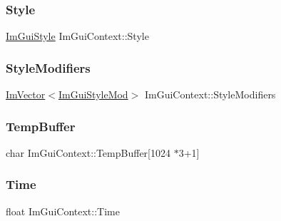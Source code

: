 \hypertarget{struct_im_gui_context_a2e682502e1a3d2c399171dd3c4fc969d}{}\label{struct_im_gui_context_a2e682502e1a3d2c399171dd3c4fc969d} 
\subsubsection{\texorpdfstring{Style}{Style}}
{\footnotesize\ttfamily \hyperlink{struct_im_gui_style}{Im\+Gui\+Style} Im\+Gui\+Context\+::\+Style}

\hypertarget{struct_im_gui_context_ac0feba14c36c7dff87211c3650815be7}{}\label{struct_im_gui_context_ac0feba14c36c7dff87211c3650815be7} 
\subsubsection{\texorpdfstring{Style\+Modifiers}{StyleModifiers}}
{\footnotesize\ttfamily \hyperlink{class_im_vector}{Im\+Vector}$<$\hyperlink{struct_im_gui_style_mod}{Im\+Gui\+Style\+Mod}$>$ Im\+Gui\+Context\+::\+Style\+Modifiers}

\hypertarget{struct_im_gui_context_a875033fc5c10bc1e050f8701055ae93b}{}\label{struct_im_gui_context_a875033fc5c10bc1e050f8701055ae93b} 
\subsubsection{\texorpdfstring{Temp\+Buffer}{TempBuffer}}
{\footnotesize\ttfamily char Im\+Gui\+Context\+::\+Temp\+Buffer\mbox{[}1024 $\ast$3+1\mbox{]}}

\hypertarget{struct_im_gui_context_a88ebae89e11da57e4567767694f7576f}{}\label{struct_im_gui_context_a88ebae89e11da57e4567767694f7576f} 
\subsubsection{\texorpdfstring{Time}{Time}}
{\footnotesize\ttfamily float Im\+Gui\+Context\+::\+Time}

\hypertarget{struct_im_gui_context_a1c6e3c1b866fa1abf473d3cd9eafce0f}{}\label{struct_im_gui_context_a1c6e3c1b866fa1abf473d3cd9eafce0f} 
